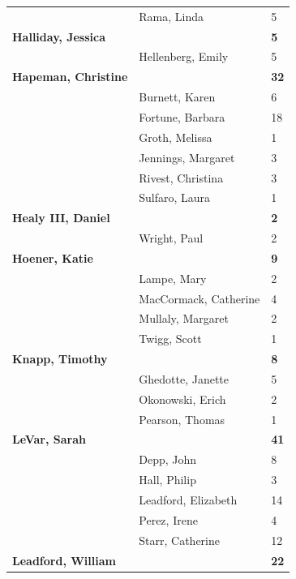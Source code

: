 \documentclass{article}\usepackage[]{graphicx}\usepackage[]{color}
\begin{document}
{\begin{longtable} { >{\raggedright}p{}|p{}p{}}
   \rowcolor[gray]{0.90} & Rama, Linda & 5 \\ 
   \rowcolor[gray]{0.90}\textbf{Halliday, Jessica} &  & \hspace{2cm}\textbf{5} \\ 
   & Hellenberg, Emily & 5 \\ 
  \textbf{Hapeman, Christine} &  & \hspace{2cm}\textbf{32} \\ 
   & Burnett, Karen & 6 \\ 
   \rowcolor[gray]{0.90} & Fortune, Barbara & 18 \\ 
   \rowcolor[gray]{0.90} & Groth, Melissa & 1 \\ 
   \rowcolor[gray]{0.90} & Jennings, Margaret & 3 \\ 
   & Rivest, Christina & 3 \\ 
   & Sulfaro, Laura & 1 \\ 
  \textbf{Healy III, Daniel} &  & \hspace{2cm}\textbf{2} \\ 
   \rowcolor[gray]{0.90} & Wright, Paul & 2 \\ 
   \rowcolor[gray]{0.90}\textbf{Hoener, Katie} &  & \hspace{2cm}\textbf{9} \\ 
   \rowcolor[gray]{0.90} & Lampe, Mary & 2 \\ 
   & MacCormack, Catherine & 4 \\ 
   & Mullaly, Margaret & 2 \\ 
   & Twigg, Scott & 1 \\ 
   \rowcolor[gray]{0.90}\textbf{Knapp, Timothy} &  & \hspace{2cm}\textbf{8} \\ 
   \rowcolor[gray]{0.90} & Ghedotte, Janette & 5 \\ 
   \rowcolor[gray]{0.90} & Okonowski, Erich & 2 \\ 
   & Pearson, Thomas & 1 \\ 
  \textbf{LeVar, Sarah} &  & \hspace{2cm}\textbf{41} \\ 
   & Depp, John & 8 \\ 
   \rowcolor[gray]{0.90} & Hall, Philip & 3 \\ 
   \rowcolor[gray]{0.90} & Leadford, Elizabeth & 14 \\ 
   \rowcolor[gray]{0.90} & Perez, Irene & 4 \\ 
   & Starr, Catherine & 12 \\ 
  \textbf{Leadford, William} &  & \hspace{2cm}\textbf{22} \\ 

\end{longtable}}
\end{document}
